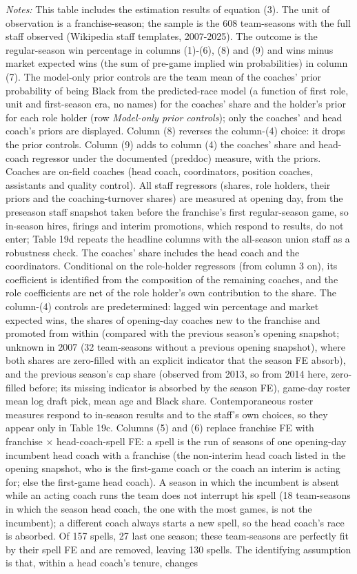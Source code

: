 {\footnotesize
\noindent\textit{Notes:} This table includes the estimation results of equation (3). The unit of observation is a franchise-season; the sample is the 608 team-seasons with the full staff observed (Wikipedia staff templates, 2007-2025). The outcome is the regular-season win percentage in columns (1)-(6), (8) and (9) and wins minus market expected wins (the sum of pre-game implied win probabilities) in column (7). The model-only prior controls are the team mean of the coaches' prior probability of being Black from the predicted-race model (a function of first role, unit and first-season era, no names) for the coaches' share and the holder's prior for each role holder (row \textit{Model-only prior controls}); only the coaches' and head coach's priors are displayed. Column (8) reverses the column-(4) choice: it drops the prior controls. Column (9) adds to column (4) the coaches' share and head-coach regressor under the documented (preddoc) measure, with the priors. Coaches are on-field coaches (head coach, coordinators, position coaches, assistants and quality control). All staff regressors (shares, role holders, their priors and the coaching-turnover shares) are measured at opening day, from the preseason staff snapshot taken before the franchise's first regular-season game, so in-season hires, firings and interim promotions, which respond to results, do not enter; Table 19d repeats the headline columns with the all-season union staff as a robustness check. The coaches' share includes the head coach and the coordinators. Conditional on the role-holder regressors (from column 3 on), its coefficient is identified from the composition of the remaining coaches, and the role coefficients are net of the role holder's own contribution to the share. The column-(4) controls are predetermined: lagged win percentage and market expected wins, the shares of opening-day coaches new to the franchise and promoted from within (compared with the previous season's opening snapshot; unknown in 2007 (32 team-seasons without a previous opening snapshot), where both shares are zero-filled with an explicit indicator that the season FE absorb), and the previous season's cap share (observed from 2013, so from 2014 here, zero-filled before; its missing indicator is absorbed by the season FE), game-day roster mean log draft pick, mean age and Black share. Contemporaneous roster measures respond to in-season results and to the staff's own choices, so they appear only in Table 19c. Columns (5) and (6) replace franchise FE with franchise $\times$ head-coach-spell FE: a spell is the run of seasons of one opening-day incumbent head coach with a franchise (the non-interim head coach listed in the opening snapshot, who is the first-game coach or the coach an interim is acting for; else the first-game head coach). A season in which the incumbent is absent while an acting coach runs the team does not interrupt his spell (18 team-seasons in which the season head coach, the one with the most games, is not the incumbent); a different coach always starts a new spell, so the head coach's race is absorbed. Of 157 spells, 27 last one season; these team-seasons are perfectly fit by their spell FE and are removed, leaving 130 spells. The identifying assumption is that, within a head coach's tenure, changes }
